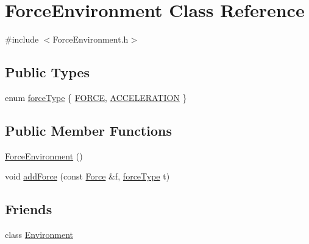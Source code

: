 \hypertarget{class_force_environment}{\section{Force\-Environment Class Reference}
\label{class_force_environment}
}


{\ttfamily \#include $<$Force\-Environment.\-h$>$}

\subsection*{Public Types}
\begin{DoxyCompactItemize}
\item 
enum \hyperlink{class_force_environment_afe538e13c2d311649eb40395b05e6838}{force\-Type} \{ \hyperlink{class_force_environment_afe538e13c2d311649eb40395b05e6838abb0afa714bfff1d26b3ea9fcbb92ec26}{F\-O\-R\-C\-E}, 
\hyperlink{class_force_environment_afe538e13c2d311649eb40395b05e6838a5298601d31daac5af1b571bb22a2565c}{A\-C\-C\-E\-L\-E\-R\-A\-T\-I\-O\-N}
 \}
\end{DoxyCompactItemize}
\subsection*{Public Member Functions}
\begin{DoxyCompactItemize}
\item 
\hyperlink{class_force_environment_add872e8e7c7cf4b237d793422ed2383e}{Force\-Environment} ()
\item 
void \hyperlink{class_force_environment_a68a551c582e2b96f08b86907120e2df8}{add\-Force} (const \hyperlink{class_force}{Force} \&f, \hyperlink{class_force_environment_afe538e13c2d311649eb40395b05e6838}{force\-Type} t)
\end{DoxyCompactItemize}
\subsection*{Friends}
\begin{DoxyCompactItemize}
\item 
class \hyperlink{class_force_environment_ad07f4de926e4e68b49b17ab4d13369d3}{Environment}
\end{DoxyCompactItemize}


